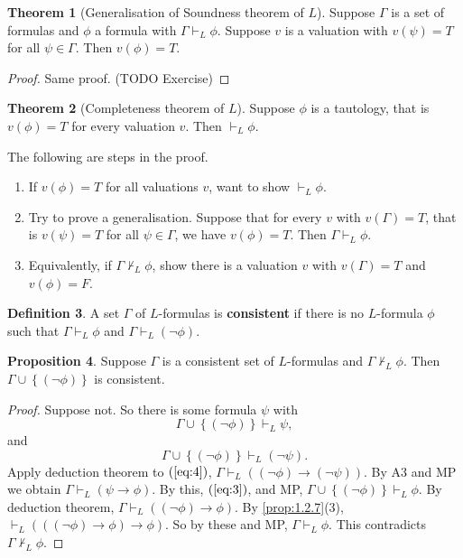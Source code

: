 \documentclass{article}
\newcommand{\rb}[1]{\left( #1 \right)}
\newcommand{\cb}[1]{\left\{ #1 \right\}}
\newcommand{\notb}[1]{\rb{\neg #1}}
\newcommand{\impb}[2]{\rb{#1 \rightarrow #2}}
\theoremstyle{definition}\newtheorem{definition}{Definition}[subsection]
\theoremstyle{definition}\newtheorem{remark}[definition]{Remark}
\theoremstyle{definition}\newtheorem*{example}{Example}
\theoremstyle{definition}\newtheorem*{note}{Note}
\newtheorem{proposition}[definition]{Proposition}
\newtheorem{theorem}[definition]{Theorem}
\begin{document}
\begin{theorem}[Generalisation of Soundness theorem of $ L $]
Suppose $ \Gamma $ is a set of formulas and $ \phi $ a formula with $ \Gamma \vdash_L \phi $. Suppose $ v $ is a valuation with $ v\rb{\psi} = T $ for all $ \psi \in \Gamma $. Then $ v\rb{\phi} = T $.
\end{theorem}

\begin{proof}
Same proof. (TODO Exercise)
\end{proof}

\begin{theorem}[Completeness theorem of $ L $]
\label{thm:1.3.4}
Suppose $ \phi $ is a tautology, that is $ v\rb{\phi} = T $ for every valuation $ v $. Then $ \vdash_L \phi $.
\end{theorem}

The following are steps in the proof.
\begin{enumerate}
\item If $ v\rb{\phi} = T $ for all valuations $ v $, want to show $ \vdash_L \phi $.
\item Try to prove a generalisation. Suppose that for every $ v $ with $ v\rb{\Gamma} = T $, that is $ v\rb{\psi} = T $ for all $ \psi \in \Gamma $, we have $ v\rb{\phi} = T $. Then $ \Gamma \vdash_L \phi $.
\item Equivalently, if $ \Gamma \not\vdash_L \phi $, show there is a valuation $ v $ with $ v\rb{\Gamma} = T $ and $ v\rb{\phi} = F $.
\end{enumerate}

\begin{definition}
A set $ \Gamma $ of $ L $-formulas is \textbf{consistent} if there is no $ L $-formula $ \phi $ such that $ \Gamma \vdash_L \phi $ and $ \Gamma \vdash_L \notb{\phi} $.
\end{definition}

\begin{proposition}
\label{prop:1.3.7}
Suppose $ \Gamma $ is a consistent set of $ L $-formulas and $ \Gamma \not\vdash_L \phi $. Then $ \Gamma \cup \cb{\notb{\phi}} $ is consistent.
\end{proposition}

\begin{proof}
Suppose not. So there is some formula $ \psi $ with
\begin{equation}
\label{eq:3}
\Gamma \cup \cb{\notb{\phi}} \vdash_L \psi,
\end{equation}
and
\begin{equation}
\label{eq:4}
\Gamma \cup \cb{\notb{\phi}} \vdash_L \notb{\psi}.
\end{equation}
Apply deduction theorem to $ \rb{\ref{eq:4}} $, $ \Gamma \vdash_L \impb{\notb{\phi}}{\notb{\psi}} $. By A3 and MP we obtain $ \Gamma \vdash_L \impb{\psi}{\phi} $. By this, $ \rb{\ref{eq:3}} $, and MP, $ \Gamma \cup \cb{\notb{\phi}} \vdash_L \phi $. By deduction theorem, $ \Gamma \vdash_L \impb{\notb{\phi}}{\phi} $. By \ref{prop:1.2.7}(3), $ \vdash_L \impb{\impb{\notb{\phi}}{\phi}}{\phi} $. So by these and MP, $ \Gamma \vdash_L \phi $. This contradicts $ \Gamma \not\vdash_L \phi $.
\end{proof}
\end{document}

